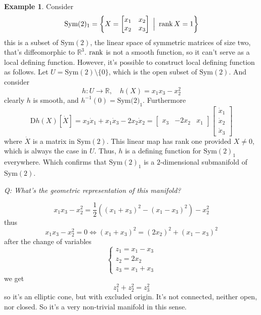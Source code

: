 \documentclass[12pt]{article}
\newcommand*{\D}{\mathrm{D}}
\theoremstyle{definition}
\newtheorem{example}{Example}[section]
\begin{document}
\begin{example}
    Consider
    \begin{equation}
        \text{Sym}(2)_1 = \left\{X = \begin{bmatrix} x_1 & x_2 \\
        x_2 & x_3 \end{bmatrix} \ \Big| \ \rank X = 1\right\} 
    \end{equation}
    this is a subset of $\text{Sym}(2)$, the linear space of symmetric matrices of size two, that's diffeomorphic to $\mathbb{R}^3$. $\rank$ is not a smooth function, so it can't serve as a local defining function. However, it's possible to construct local defining function as follows. Let $U = \text{Sym}(2) \setminus \{0\}$, which is the open subset of $\text{Sym}(2)$. And consider 
    \begin{equation}
        h :  U \to \mathbb{R}, \quad h(X) = x_1 x_3 - x_2^2
    \end{equation}
    clearly $h$ is smooth, and $h^{-1}(0) = \text{Sym(2)}_1$. Furthermore
    \begin{equation}
        \D h(X)[\dot{X}] = x_3 \dot{x}_1 + x_1 \dot{x}_3 - 2x_2 \dot{x}_2 = \begin{bmatrix}
            x_3 & -2x_2 & x_1 
        \end{bmatrix} \begin{bmatrix}
            \dot{x}_1 \\
            \dot{x}_2 \\
            \dot{x}_3
        \end{bmatrix}
    \end{equation} 
    where $\dot{X}$ is a matrix in $\text{Sym}(2)$. This linear map has rank one provided $X \neq 0$, which is always the case in $U$. 
    Thus, $h$ is a defining function for $\text{Sym}(2)_1$ everywhere. Which confirms that $\text{Sym}(2)_1$ is a $2$-dimensional submanifold of $\text{Sym}(2)$. 
    
    \textit{Q: What's the geometric representation of this manifold?}

    \begin{equation}
        x_1x_3 - x_2^2 = \frac{1}{2} \left((x_1 + x_3)^2 - (x_1 - x_3)^2\right) - x_2^2 
    \end{equation}
    thus 
    \begin{equation*}
        x_1x_3 - x_2^2 = 0 \Leftrightarrow (x_1 + x_3)^2 = (2x_2)^2 + (x_1 - x_3)^2 
    \end{equation*}
    after the change of variables 
    \begin{equation}
        \begin{cases}
            z_1 = x_1 - x_3 \\
            z_2 = 2x_2 \\
            z_3 = x_1 + x_3 
        \end{cases}
    \end{equation}
    we get 
    \begin{equation}
        z_1^2 + z_2^2 = z_3^2 
    \end{equation}
    so it's an elliptic cone, but with excluded origin. It's not connected, neither open, nor closed. So it's a very non-trivial manifold in this sense. 
    

\end{example}
\end{document}
